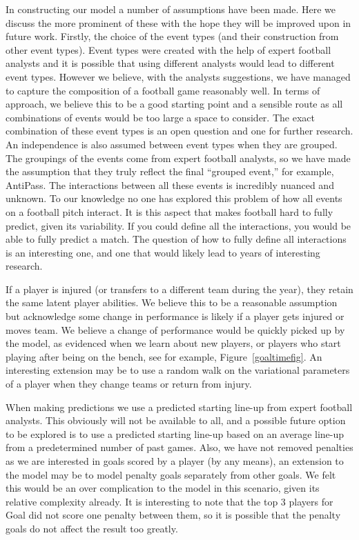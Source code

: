 \documentclass[11pt,a4paper]{article}
\begin{document}
In constructing our model a number of assumptions have been made. Here we 
discuss the more prominent of these with the hope they will be improved upon 
in future work. Firstly, the choice of the event types (and their construction 
from other event types). Event types were created with the help of expert football 
analysts and it is possible that using different analysts would lead to 
different event types. However we believe, with the analysts suggestions, we 
have managed to capture the composition of a football game reasonably well. 
In terms of approach, we believe this to be a good starting point and a sensible 
route as all combinations of events would be too large a space to consider. The 
exact combination of these event types is an open question and one for further 
research. An independence is also assumed between event types when they are grouped. 
The groupings of the events come from expert football analysts, so we have made 
the assumption that they truly reflect the final ``grouped event,'' for example, 
AntiPass. The interactions between all these events is incredibly nuanced and 
unknown. To our knowledge no one has explored this problem of how all events 
on a football pitch interact. It is this aspect that makes football hard to fully 
predict, given its variability. If you could define all the interactions, you 
would be able to fully predict a match. The question of how to fully define all 
interactions is an interesting one, and one that would likely lead to years of 
interesting research. 

If a player is injured (or transfers to a different team during the year), they 
retain the same latent player abilities. We believe this to be a reasonable 
assumption but acknowledge some change in performance is likely if a player gets 
injured or moves team. We believe a change of performance would be quickly 
picked up by the model, as evidenced when we learn about new players, or players 
who start playing after being on the bench, see for example, Figure~\ref{goaltimefig}. 
An interesting extension may be to use a random walk on the variational 
parameters of a player when they change teams or return from injury.  

When making predictions we use a predicted starting line-up from expert football 
analysts. This obviously will not be available to all, and a possible future option 
to be explored is to use a predicted starting line-up based on an average 
line-up from a predetermined number of past games. Also, we have not removed 
penalties as we are interested in goals scored by a player (by any means), an 
extension to the model may be to model penalty goals separately from other goals. 
We felt this would be an over complication to the model in this scenario, given 
its relative complexity already. It is interesting to note that the top 3 players 
for Goal did not score one penalty between them, so it is possible that the 
penalty goals do not affect the result too greatly.
\end{document}
